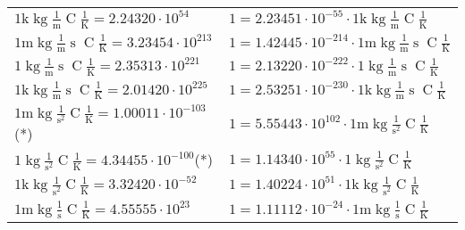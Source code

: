 \begin{center}
\begin{longtable}{l l}
{\color{gray}$1 \bm{\mathrm{ k}}\operatorname{kg}\frac1{\operatorname{m}}{}{\operatorname{C}}\frac1{\operatorname{K}} = 2.24320\cdot10^{54} $}   & {\color{gray}$ 1 = 2.23451\cdot10^{-55} \cdot 1 \bm{\mathrm{ k}}\operatorname{kg}\frac1{\operatorname{m}}{}{\operatorname{C}}\frac1{\operatorname{K}}$}  \\
{\color{gray}$1 \bm{\mathrm{ m}}\operatorname{kg}\frac1{\operatorname{m}}{\operatorname{s}}{\operatorname{C}}\frac1{\operatorname{K}} = 3.23454\cdot10^{213} $}   & {\color{gray}$ 1 = 1.42445\cdot10^{-214} \cdot 1 \bm{\mathrm{ m}}\operatorname{kg}\frac1{\operatorname{m}}{\operatorname{s}}{\operatorname{C}}\frac1{\operatorname{K}}$}  \\
{\color{black}$1 \bm{\mathrm{ }}\operatorname{kg}\frac1{\operatorname{m}}{\operatorname{s}}{\operatorname{C}}\frac1{\operatorname{K}} = 2.35313\cdot10^{221} $}   & {\color{black}$ 1 = 2.13220\cdot10^{-222} \cdot 1 \bm{\mathrm{ }}\operatorname{kg}\frac1{\operatorname{m}}{\operatorname{s}}{\operatorname{C}}\frac1{\operatorname{K}}$}  \\
{\color{gray}$1 \bm{\mathrm{ k}}\operatorname{kg}\frac1{\operatorname{m}}{\operatorname{s}}{\operatorname{C}}\frac1{\operatorname{K}} = 2.01420\cdot10^{225} $}   & {\color{gray}$ 1 = 2.53251\cdot10^{-230} \cdot 1 \bm{\mathrm{ k}}\operatorname{kg}\frac1{\operatorname{m}}{\operatorname{s}}{\operatorname{C}}\frac1{\operatorname{K}}$}  \\
{\color{gray}$1 \bm{\mathrm{ m}}\operatorname{kg}{}\frac1{\operatorname{s}^2}{\operatorname{C}}\frac1{\operatorname{K}} = 1.00011\cdot10^{-103} $}\quad(*) & {\color{gray}$ 1 = 5.55443\cdot10^{102} \cdot 1 \bm{\mathrm{ m}}\operatorname{kg}{}\frac1{\operatorname{s}^2}{\operatorname{C}}\frac1{\operatorname{K}}$}  \\
{\color{black}$1 \bm{\mathrm{ }}\operatorname{kg}{}\frac1{\operatorname{s}^2}{\operatorname{C}}\frac1{\operatorname{K}} = 4.34455\cdot10^{-100} $}\quad(*) & {\color{black}$ 1 = 1.14340\cdot10^{55} \cdot 1 \bm{\mathrm{ }}\operatorname{kg}{}\frac1{\operatorname{s}^2}{\operatorname{C}}\frac1{\operatorname{K}}$}  \\
{\color{gray}$1 \bm{\mathrm{ k}}\operatorname{kg}{}\frac1{\operatorname{s}^2}{\operatorname{C}}\frac1{\operatorname{K}} = 3.32420\cdot10^{-52} $}   & {\color{gray}$ 1 = 1.40224\cdot10^{51} \cdot 1 \bm{\mathrm{ k}}\operatorname{kg}{}\frac1{\operatorname{s}^2}{\operatorname{C}}\frac1{\operatorname{K}}$}  \\
{\color{gray}$1 \bm{\mathrm{ m}}\operatorname{kg}{}\frac1{\operatorname{s}}{\operatorname{C}}\frac1{\operatorname{K}} = 4.55555\cdot10^{23} $}   & {\color{gray}$ 1 = 1.11112\cdot10^{-24} \cdot 1 \bm{\mathrm{ m}}\operatorname{kg}{}\frac1{\operatorname{s}}{\operatorname{C}}\frac1{\operatorname{K}}$}  \\

\end{longtable}
\end{center}
